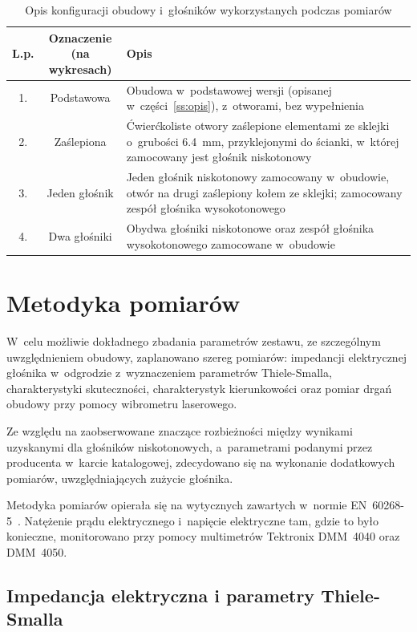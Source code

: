 \documentclass[12pt]{oska}
\begin{document}
		\begin{table}[!ht]
			\centering
			\caption{Opis konfiguracji obudowy i~głośników wykorzystanych podczas pomiarów}
			\label{t:obudowa}
			\begin{tabular}{|c|c|m{}|}
				\hline
				\textbf{L.p.} & \makecell{\textbf{Oznaczenie}\\\textbf{(na wykresach)}} & \centering\textbf{Opis} \tabularnewline\hline
				1. & Podstawowa & Obudowa w~podstawowej wersji (opisanej w~części~\ref{ss:opis}), z~otworami, bez wypełnienia \\\hline
				2. & Zaślepiona & Ćwierćkoliste otwory zaślepione elementami ze sklejki o~grubości \SI{6,4}{\milli\metre}, przyklejonymi do ścianki, w~której zamocowany jest głośnik niskotonowy\\\hline
				\hline
				3. & Jeden głośnik & Jeden głośnik niskotonowy zamocowany w~obudowie, otwór na drugi zaślepiony kołem ze sklejki; zamocowany zespół głośnika wysokotonowego \\\hline
				4. & Dwa głośniki & Obydwa głośniki niskotonowe oraz zespół głośnika wysokotonowego zamocowane w~obudowie\\\hline
			\end{tabular}
		\end{table}

\section{Metodyka pomiarów}

	W~celu możliwie dokładnego zbadania parametrów zestawu, ze szczególnym uwzględnieniem obudowy, zaplanowano szereg pomiarów: impedancji elektrycznej głośnika w~odgrodzie z~wyznaczeniem parametrów Thiele-Smalla, charakterystyki skuteczności, charakterystyk kierunkowości oraz pomiar drgań obudowy przy pomocy wibrometru laserowego.
	
	Ze względu na zaobserwowane znaczące rozbieżności między wynikami uzyskanymi dla głośników niskotonowych, a~parametrami podanymi przez producenta w~karcie katalogowej, zdecydowano się na wykonanie dodatkowych pomiarów, uwzględniających zużycie głośnika.
	
	Metodyka pomiarów opierała się na wytycznych zawartych w~normie EN~60268-5~\cite{norma}. Natężenie prądu elektrycznego i~napięcie elektryczne tam, gdzie to było konieczne, monitorowano przy pomocy multimetrów Tektronix DMM~4040 oraz DMM~4050.
	
		\subsection{Impedancja elektryczna i parametry Thiele-Smalla}
			
\end{document}
